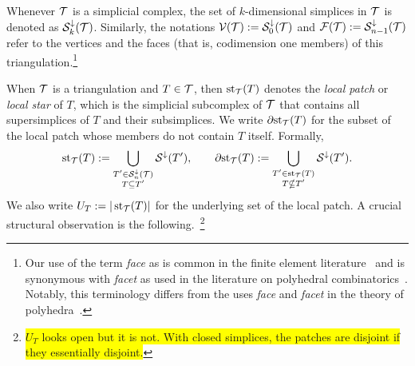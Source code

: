 \documentclass[10pt,a4paper]{article}
\newcommand{\todo}[1]{{\colorbox{yellow}{#1}}}
\newcommand{\mwl}[1]{{\color{red}#1}}
\begin{document}
Whenever ${\mathcal T}$ is a simplicial complex, 
the set of $k$-dimensional simplices in ${\mathcal T}$ is denoted as ${\mathcal S}^{\downarrow}_{{k}}({\mathcal T})$. 
Similarly, the notations ${\mathcal V}({\mathcal T}) := {\mathcal S}^{\downarrow}_{0}({\mathcal T})$ and ${\mathcal F}({\mathcal T}) := {\mathcal S}^{\downarrow}_{n-1}({\mathcal T})$ refer to the vertices and the faces (that is, codimension one members) of this triangulation.\footnote{
    Our use of the term \textit{face} as is common in the finite element literature~\cite{brenner2008mathematical}
    and is synonymous with \textit{facet} as used in the literature on polyhedral combinatorics~\cite{schrijver1998theory}.
    Notably, this terminology differs from the uses \textit{face} and \textit{facet} in the theory of polyhedra~\cite{ziegler1995lectures}.
}

When ${\mathcal T}$ is a triangulation and $T \in {\mathcal T}$, then $\operatorname{st}_{{\mathcal T}}(T)$ denotes the \emph{local patch} or \textit{local star} of $T$, 
which is the simplicial subcomplex of ${\mathcal T}$ that contains all supersimplices of $T$ and their subsimplices. 
We write ${\partial \rm st}_{{\mathcal T}}(T)$ for the subset of the local patch whose members do not contain $T$ itself. 
Formally,
\begin{gather*}
    \operatorname{st}_{{\mathcal T}}(T) := \bigcup_{ \substack{ T' \in {\mathcal S}^{\downarrow}_{n}({\mathcal T}) \\ T \subseteq T' } } {\mathcal S}^{\downarrow}(T'),
    \qquad 
    {\partial \rm st}_{{\mathcal T}}(T) := \bigcup_{ \substack{ T' \in \operatorname{st}_{{\mathcal T}}(T) \\ T \nsubseteq T' } } {\mathcal S}^{\downarrow}(T').
\end{gather*}
We also write $U_T := | \operatorname{st}_{{\mathcal T}}(T) |$ for the underlying set of the local patch. 
A crucial structural observation is the following.~\footnote{\todo{$U_T$ looks open but it is not. With closed simplices, the patches are disjoint if they essentially disjoint.}}  
\end{document}
